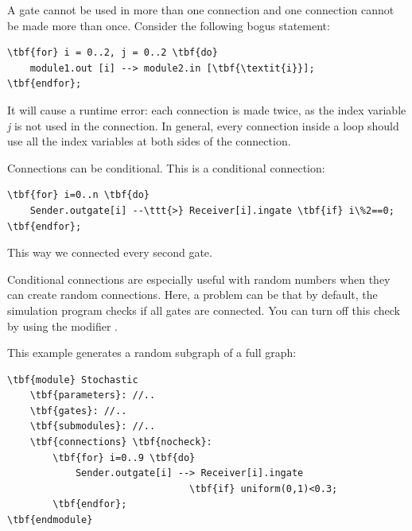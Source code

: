 A gate cannot be used in more than one connection and one connection
cannot be made more than once. Consider the following bogus statement:


\begin{Verbatim}[commandchars=\\\{\}]
\tbf{for} i = 0..2, j = 0..2 \tbf{do}
    module1.out [i] --> module2.in [\tbf{\textit{i}}];
\tbf{endfor};
\end{Verbatim}


It will cause a runtime error: each connection is made twice,
as the index variable \textit{j} is not used in the connection. In
general, every connection inside a loop should use all the index
variables at both sides of the connection.




Connections can be conditional. This is a conditional connection:


\begin{Verbatim}[commandchars=\\\{\}]
\tbf{for} i=0..n \tbf{do}
    Sender.outgate[i] --\ttt{>} Receiver[i].ingate \tbf{if} i\%2==0;
\tbf{endfor};
\end{Verbatim}


This way we connected every second gate.





Conditional connections are especially useful with random numbers when
they can create random connections. Here, a
problem can be that by default, the simulation program checks if all
gates are connected. You can turn off this check by using the
 modifier
.

This example generates a random subgraph of a full graph:


\begin{Verbatim}[commandchars=\\\{\}]
\tbf{module} Stochastic
    \tbf{parameters}: //..
    \tbf{gates}: //..
    \tbf{submodules}: //..
    \tbf{connections} \tbf{nocheck}:
        \tbf{for} i=0..9 \tbf{do}
            Sender.outgate[i] --> Receiver[i].ingate
                                \tbf{if} uniform(0,1)<0.3;
        \tbf{endfor};
\tbf{endmodule}
\end{Verbatim}


